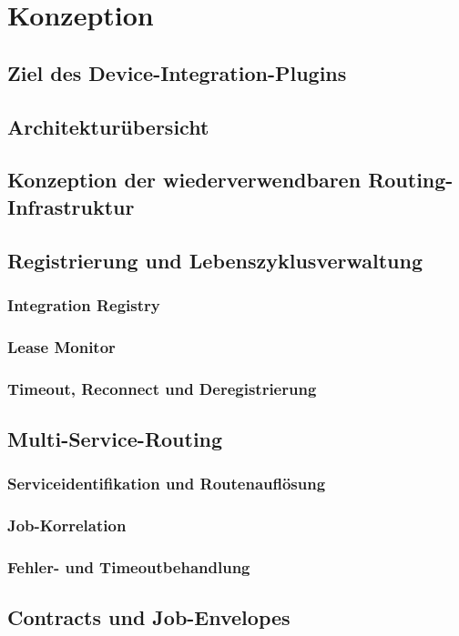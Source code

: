 \chapter{Konzeption}
\section{Ziel des Device-Integration-Plugins}
\section{Architekturübersicht}
\section{Konzeption der wiederverwendbaren Routing-Infrastruktur}

\section{Registrierung und Lebenszyklusverwaltung}
\subsection{Integration Registry}
\subsection{Lease Monitor}
\subsection{Timeout, Reconnect und Deregistrierung}

\section{Multi-Service-Routing}
\subsection{Serviceidentifikation und Routenauflösung}
\subsection{Job-Korrelation}
\subsection{Fehler- und Timeoutbehandlung}

\section{Contracts und Job-Envelopes}
